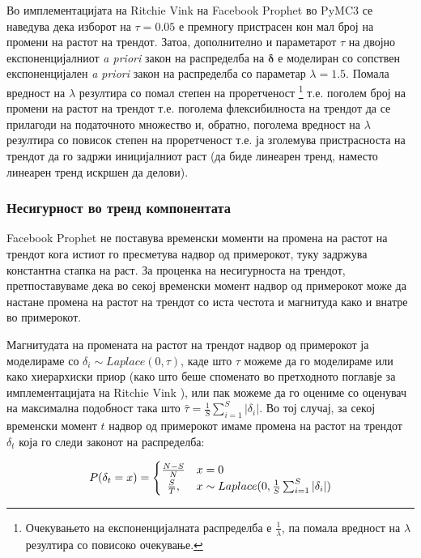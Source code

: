 \documentclass[12pt]{article}
\numberwithin{equation}{section}
\begin{document}
Во имплементацијата на Ritchie Vink на Facebook Prophet во PyMC3 \cite{vink} се наведува дека изборот на \(\tau = 0.05\) е премногу пристрасен кон мал број на промени на растот на трендот. Затоа, дополнително и параметарот \(\tau\) на двојно експоненцијалниот \textit{a priori} закон на распределба на \(\boldsymbol{\delta}\) е моделиран со сопствен експоненцијален \textit{a priori} закон на распределба со параметар \(\lambda = 1.5\). Помала вредност на \(\lambda\) резултира со помал степен на проретченост \footnote{Очекувањето на експоненцијалната распределба е \(\frac{1}{\lambda}\), па помала вредност на \(\lambda\) резултира со повисоко очекување.} т.е. поголем број на промени на растот на трендот т.е. поголема флексибилноста на трендот да се прилагоди на податочното множество и, обратно, поголема вредност на \(\lambda\) резултира со повисок степен на проретченост т.е. ја зголемува пристрасноста на трендот да го задржи иницијалниот раст (да биде линеарен тренд, наместо линеарен тренд искршен да делови).

\subsubsection{Несигурност во тренд компонентата}

Facebook Prophet не поставува временски моменти на промена на растот на трендот кога истиот го пресметува надвор од примерокот, туку задржува константна стапка на раст. За проценка на несигурноста на трендот, претпоставуваме дека во секој временски момент надвор од примерокот може да настане промена на растот на трендот со иста честота и магнитуда како и внатре во примерокот.

Магнитудата на промената на растот на трендот надвор од примерокот ја моделираме со \(\delta_i \sim Laplace(0, \tau)\), каде што \(\tau\) можеме да го моделираме или како хиерархиски приор (како што беше споменато во претходното поглавје за имплементацијата на Ritchie Vink \cite{vink}), или пак можеме да го оцениме со оценувач на максимална подобност така што \(\widehat{\tau} = \frac{1}{S}\sum_{i=1}^{S}|\delta_i|\). Во тој случај, за секој временски момент \(t\) надвор од примерокот имаме промена на растот на трендот \(\delta_t\) која го следи законот на распределба:

\begin{equation}\label{trend_uncertainty}
P(\delta_t=x) =
    \begin{cases}
        \frac{N - S}{N} & x=0 \\
        \hfil \frac{S}{T}, & x \sim Laplace(0, \frac{1}{S}\sum_{i=1}^{S}|\delta_i|)
    \end{cases}
\end{equation}
\end{document}
